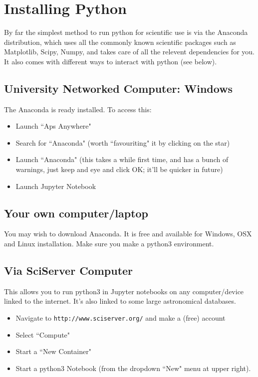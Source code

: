 \documentclass[%
 reprint,
 amsmath,amssymb,
 aps,
]{revtex4-1}
\begin{document}

\section{Installing Python \label{sec:install}} 

By far the simplest method to run python for scientific use is via the Anaconda distribution, which uses all the commonly known scientific packages such as Matplotlib, Scipy, Numpy, and takes care of all the relevent dependencies for you. It also comes with different ways to interact with python (see below). 

\subsection{University Networked Computer: Windows}
The Anaconda is ready installed. To access this: 
\begin{itemize}
\item Launch  ``Aps Anywhere"
\item Search for ``Anaconda" (worth ``favouriting" it by clicking on the star)
\item Launch ``Anaconda" (this takes a while first time, and has a bunch of warnings, just keep and eye and click OK; it'll be quicker in future)
\item Launch Jupyter Notebook
\end{itemize}

\subsection{Your own computer/laptop}

You may wish to download Anaconda. It is free and available for Windows, OSX and Linux installation. Make sure you make a python3 environment. 

\subsection{Via SciServer Computer}
This allows you to run python3 in Jupyter notebooks on any computer/device linked to the internet. It's also linked to some large astronomical databases. 
\begin{itemize}
\item Navigate to {\tt http://www.sciserver.org/} and make a (free) account
\item Select ``Compute"
\item Start a ``New Container"
\item Start a python3 Notebook (from the dropdown ``New" menu at upper right).
\end{itemize}
\end{document}
